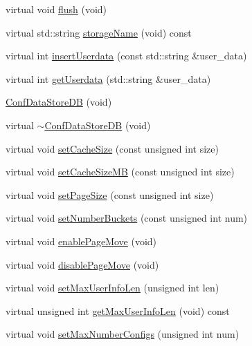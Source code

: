 \begin{DoxyCompactItemize}
virtual void \mbox{\hyperlink{classFILEDB_1_1ConfDataStoreDB_a982ae3b2108acbf75ab15a939fc7871b}{flush}} (void)
\item 
virtual std\+::string \mbox{\hyperlink{classFILEDB_1_1ConfDataStoreDB_acac74e3143398de6c5da068f37a762ee}{storage\+Name}} (void) const
\item 
virtual int \mbox{\hyperlink{classFILEDB_1_1ConfDataStoreDB_a8fa05198f3ff1f405fbdfc6a51f43d1a}{insert\+Userdata}} (const std\+::string \&user\+\_\+data)
\item 
virtual int \mbox{\hyperlink{classFILEDB_1_1ConfDataStoreDB_abf7ce0847e1d68f960836826d68c0079}{get\+Userdata}} (std\+::string \&user\+\_\+data)
\item 
\mbox{\hyperlink{classFILEDB_1_1ConfDataStoreDB_a575d901daeccae08bcda5b2a60681e1b}{Conf\+Data\+Store\+DB}} (void)
\item 
virtual \mbox{\hyperlink{classFILEDB_1_1ConfDataStoreDB_a39b48750dbc9bd0d4ca8c9787edee897}{$\sim$\+Conf\+Data\+Store\+DB}} (void)
\item 
virtual void \mbox{\hyperlink{classFILEDB_1_1ConfDataStoreDB_af432d4a9c6dfb21a6ccb1969343cb4fa}{set\+Cache\+Size}} (const unsigned int size)
\item 
virtual void \mbox{\hyperlink{classFILEDB_1_1ConfDataStoreDB_aa5fafbdd147d1b66d8fcc6821dc3804f}{set\+Cache\+Size\+MB}} (const unsigned int size)
\item 
virtual void \mbox{\hyperlink{classFILEDB_1_1ConfDataStoreDB_a50004cb93881959d0846a12d920a95c8}{set\+Page\+Size}} (const unsigned int size)
\item 
virtual void \mbox{\hyperlink{classFILEDB_1_1ConfDataStoreDB_a20a5d092cdcfbca4dbce15b2da006065}{set\+Number\+Buckets}} (const unsigned int num)
\item 
virtual void \mbox{\hyperlink{classFILEDB_1_1ConfDataStoreDB_ae8f437f44366624ac0d5aba306a5ba42}{enable\+Page\+Move}} (void)
\item 
virtual void \mbox{\hyperlink{classFILEDB_1_1ConfDataStoreDB_afcbba500d85f2a92419193183c428a0f}{disable\+Page\+Move}} (void)
\item 
virtual void \mbox{\hyperlink{classFILEDB_1_1ConfDataStoreDB_a02a2fcc79ba97c11b4ec1ec0321e5415}{set\+Max\+User\+Info\+Len}} (unsigned int len)
\item 
virtual unsigned int \mbox{\hyperlink{classFILEDB_1_1ConfDataStoreDB_a0fc37111156b6c7080ff6a6831c847fc}{get\+Max\+User\+Info\+Len}} (void) const
\item 
virtual void \mbox{\hyperlink{classFILEDB_1_1ConfDataStoreDB_acd6f44fc7a83322417ad1a7ea7d2b6ea}{set\+Max\+Number\+Configs}} (unsigned int num)

\end{DoxyCompactItemize}
